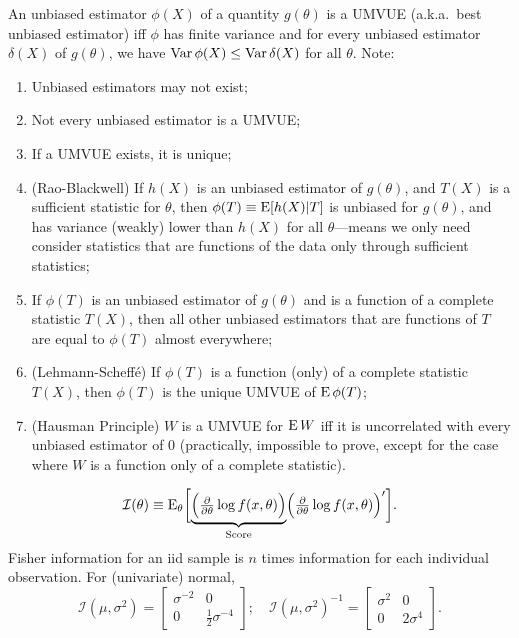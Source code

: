 \documentclass[8pt,letterpaper, landscape]{extarticle} %
\renewcommand{\ln}{\log}
\begin{document}
\begin{multicols}{3}
\begin{description}
 An unbiased estimator $ \phi (X) $ of a quantity $ g(\theta) $ is a UMVUE (a.k.a.\ best unbiased estimator) iff $ \phi $ has finite variance and for every unbiased estimator $ \delta (X) $ of $ g(\theta) $, we have $ \operatorname{Var} \phi (X) \leq \operatorname{Var} \delta (X) $ for all $ \theta $. Note:
\begin{enumerate}
\item Unbiased estimators may not exist;
\item Not every unbiased estimator is a UMVUE;
\item If a UMVUE exists, it is unique;
\item (Rao-Blackwell) If $ h(X) $ is an unbiased estimator of $ g(\theta) $, and $ T(X) $ is a sufficient statistic for $ \theta $, then $ \phi(T) \equiv \operatorname{E} [h(X)|T] $ is unbiased for $ g(\theta) $, and has variance (weakly) lower than $ h(X) $ for all $ \theta $---means we only need consider statistics that are functions of the data only through sufficient statistics;
\item If $ \phi(T) $ is an unbiased estimator of $ g(\theta) $ and is a function of a complete statistic $ T(X) $, then all other unbiased estimators that are functions of $ T $ are equal to $ \phi(T) $ almost everywhere;
\item (Lehmann-Scheff\'{e}) If $ \phi(T) $ is a function (only) of a complete statistic $ T(X) $, then $ \phi(T) $ is the unique UMVUE of $ \operatorname{E} \phi(T) $;
\item (Hausman Principle) $ W $ is a UMVUE for $ \operatorname{E} W $ iff it is uncorrelated with every unbiased estimator of $ 0 $ (practically, impossible to prove, except for the case where $ W $ is a function only of a complete statistic).
\end{enumerate}

$$ \mathcal{I}(\theta) \equiv \E_\theta \biggl [ \underbrace{ \Bigl ( \tfrac{\partial}{\partial \theta} \ln f(x, \theta ) \Bigr )}_{\text{Score}}  \Bigl ( \tfrac{\partial}{\partial \theta} \ln f(x, \theta) \Bigr )' \biggr ]. $$
Fisher information for an iid sample is $ n $ times information for each individual observation. For (univariate) normal,
$$ \mathcal{I}(\mu, \sigma^2) =  \begin{bmatrix}
\sigma^{-2} & 0 \\ 
0 & \frac{1}{2} \sigma^{-4}
\end{bmatrix} ; \quad
\mathcal{I}(\mu, \sigma^2)^{-1} =  \begin{bmatrix}
\sigma^{2} & 0 \\ 
0 & 2 \sigma^{4}
\end{bmatrix} . $$


\end{description}
\end{multicols}
\end{document}
